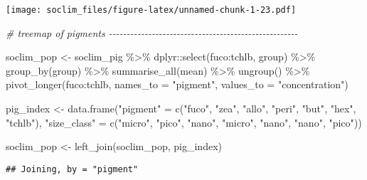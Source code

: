\documentclass[
]{article}
\newenvironment{Shaded}{\begin{snugshade}}{\end{snugshade}}
\newcommand{\AttributeTok}[1]{\textcolor[rgb]{0.77,0.63,0.00}{#1}}
\newcommand{\CommentTok}[1]{\textcolor[rgb]{0.56,0.35,0.01}{\textit{#1}}}
\newcommand{\FunctionTok}[1]{\textcolor[rgb]{0.00,0.00,0.00}{#1}}
\newcommand{\NormalTok}[1]{#1}
\newcommand{\OtherTok}[1]{\textcolor[rgb]{0.56,0.35,0.01}{#1}}
\newcommand{\SpecialCharTok}[1]{\textcolor[rgb]{0.00,0.00,0.00}{#1}}
\newcommand{\StringTok}[1]{\textcolor[rgb]{0.31,0.60,0.02}{#1}}
\begin{document}
\texttt{[image: soclim\_files/figure-latex/unnamed-chunk-1-23.pdf]}

\begin{Shaded}
\begin{Highlighting}[]
\CommentTok{\# treemap of pigments {-}{-}{-}{-}{-}{-}{-}{-}{-}{-}{-}{-}{-}{-}{-}{-}{-}{-}{-}{-}{-}{-}{-}{-}{-}{-}{-}{-}{-}{-}{-}{-}{-}{-}{-}{-}{-}{-}{-}{-}{-}{-}{-}{-}{-}{-}{-}{-}{-}{-}{-}{-}{-}}

\NormalTok{soclim\_pop }\OtherTok{\textless{}{-}}\NormalTok{ soclim\_pig }\SpecialCharTok{\%\textgreater{}\%}\NormalTok{ dplyr}\SpecialCharTok{::}\FunctionTok{select}\NormalTok{(fuco}\SpecialCharTok{:}\NormalTok{tchlb, group) }\SpecialCharTok{\%\textgreater{}\%} 
  \FunctionTok{group\_by}\NormalTok{(group) }\SpecialCharTok{\%\textgreater{}\%} 
  \FunctionTok{summarise\_all}\NormalTok{(mean) }\SpecialCharTok{\%\textgreater{}\%} 
  \FunctionTok{ungroup}\NormalTok{() }\SpecialCharTok{\%\textgreater{}\%} 
  \FunctionTok{pivot\_longer}\NormalTok{(fuco}\SpecialCharTok{:}\NormalTok{tchlb, }\AttributeTok{names\_to =} \StringTok{"pigment"}\NormalTok{, }\AttributeTok{values\_to =} \StringTok{"concentration"}\NormalTok{)}

\NormalTok{pig\_index }\OtherTok{\textless{}{-}} \FunctionTok{data.frame}\NormalTok{(}\StringTok{"pigment"} \OtherTok{=} \FunctionTok{c}\NormalTok{(}\StringTok{"fuco"}\NormalTok{, }\StringTok{"zea"}\NormalTok{, }\StringTok{"allo"}\NormalTok{, }\StringTok{"peri"}\NormalTok{, }\StringTok{"but"}\NormalTok{, }\StringTok{"hex"}\NormalTok{, }\StringTok{"tchlb"}\NormalTok{),}
                        \StringTok{"size\_class"} \OtherTok{=} \FunctionTok{c}\NormalTok{(}\StringTok{"micro"}\NormalTok{, }\StringTok{"pico"}\NormalTok{, }\StringTok{"nano"}\NormalTok{, }\StringTok{"micro"}\NormalTok{, }\StringTok{"nano"}\NormalTok{, }\StringTok{"nano"}\NormalTok{, }\StringTok{"pico"}\NormalTok{))}

\NormalTok{soclim\_pop }\OtherTok{\textless{}{-}} \FunctionTok{left\_join}\NormalTok{(soclim\_pop, pig\_index)}
\end{Highlighting}
\end{Shaded}

\begin{verbatim}
## Joining, by = "pigment"
\end{verbatim}
\end{document}
